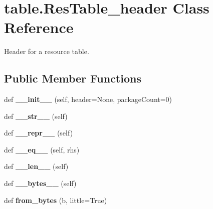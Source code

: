 \hypertarget{classtable_1_1ResTable__header}{}\section{table.\+Res\+Table\+\_\+header Class Reference}
\label{classtable_1_1ResTable__header}


Header for a resource table.  


\subsection*{Public Member Functions}
\begin{DoxyCompactItemize}
\item 
\mbox{\label{classtable_1_1ResTable__header_a1d299cd089581f2dac6a60806d732551}} 
def {\bfseries \+\_\+\+\_\+init\+\_\+\+\_\+} (self, header=None, package\+Count=0)
\item 
\mbox{\label{classtable_1_1ResTable__header_a3d38ea2e48035c5116f0e244317c6eec}} 
def {\bfseries \+\_\+\+\_\+str\+\_\+\+\_\+} (self)
\item 
\mbox{\label{classtable_1_1ResTable__header_aa821289feae146ab65a569913b6c0221}} 
def {\bfseries \+\_\+\+\_\+repr\+\_\+\+\_\+} (self)
\item 
\mbox{\label{classtable_1_1ResTable__header_ad6d86c4c2bede511891877cb9ff30491}} 
def {\bfseries \+\_\+\+\_\+eq\+\_\+\+\_\+} (self, rhs)
\item 
\mbox{\label{classtable_1_1ResTable__header_a27fc506e4adb798a9886b7d8ae2ca48d}} 
def {\bfseries \+\_\+\+\_\+len\+\_\+\+\_\+} (self)
\item 
\mbox{\label{classtable_1_1ResTable__header_a6f88915e31bbaf11f2fd7f5fbf5094bb}} 
def {\bfseries \+\_\+\+\_\+bytes\+\_\+\+\_\+} (self)
\item 
\mbox{\label{classtable_1_1ResTable__header_ab3fa76332e7ab42f2562e308db885d27}} 
def {\bfseries from\+\_\+bytes} (b, little=True)
\end{DoxyCompactItemize}
